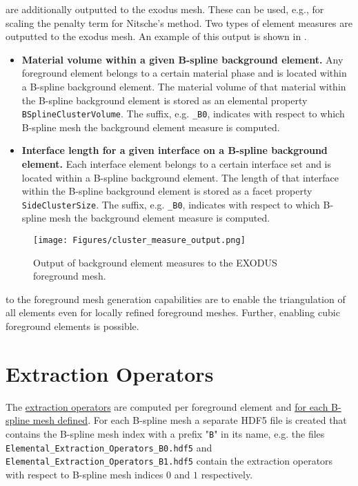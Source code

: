  are additionally outputted to the exodus mesh. These can be used, e.g., for scaling the penalty term for Nitsche's method. Two types of element measures are outputted to the exodus mesh. An example of this output is shown in .
\begin{itemize}
    \item \textbf{Material volume within a given B-spline background element.} Any foreground element belongs to a certain material phase and is located within a B-spline background element. The material volume of that material within the B-spline background element is stored as an elemental property \texttt{BSplineClusterVolume}. The suffix, e.g. \texttt{\_B0}, indicates with respect to which B-spline mesh the background element measure is computed.
    \item \textbf{Interface length for a given interface on a B-spline background element.} Each interface element belongs to a certain interface set and is located within a B-spline background element. The length of that interface within the B-spline background element is stored as a facet property \texttt{SideClusterSize}. The suffix, e.g. \texttt{\_B0}, indicates with respect to which B-spline mesh the background element measure is computed.
\end{itemize}

\begin{figure}[h]
    \vspace{0.5cm}
    \begin{center}
    \texttt{[image: Figures/cluster\_measure\_output.png]}
    \caption{Output of background element measures to the EXODUS foreground mesh.} 
    \label{fig:cluster_measure_output}
    \end{center}
\end{figure}

 to the foreground mesh generation capabilities are to enable the triangulation of all elements even for locally refined foreground meshes. Further, enabling cubic foreground elements is possible.

\section{Extraction Operators}
\label{sec:tutorial_extraction_ops}

The \hyperref[eq:extraction_operator]{extraction operators} are computed per foreground element and \hyperlink{bspline_mesh_definition}{for each B-spline mesh defined}. For each B-spline mesh a separate HDF5 file is created that contains the B-spline mesh index with a prefix "\texttt{B}" in its name, 
\newline e.g. the files \texttt{Elemental\_Extraction\_Operators\_B0.hdf5} and
\newline \texttt{Elemental\_Extraction\_Operators\_B1.hdf5} contain the extraction operators with respect to B-spline mesh indices $0$ and $1$ respectively.

